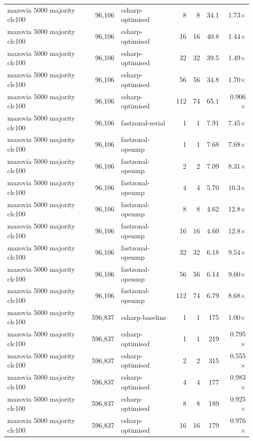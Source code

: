 \begin{tabular}{lrlrrrr}
mazovia 5000 majority clc100 & 96,106 & csharp-optimised & 8 & 8 & 34.1 & 1.73$\times$ \\
mazovia 5000 majority clc100 & 96,106 & csharp-optimised & 16 & 16 & 40.8 & 1.44$\times$ \\
mazovia 5000 majority clc100 & 96,106 & csharp-optimised & 32 & 32 & 39.5 & 1.49$\times$ \\
mazovia 5000 majority clc100 & 96,106 & csharp-optimised & 56 & 56 & 34.8 & 1.70$\times$ \\
mazovia 5000 majority clc100 & 96,106 & csharp-optimised & 112 & 74 & 65.1 & 0.906$\times$ \\
mazovia 5000 majority clc100 & 96,106 & fastzonal-serial & 1 & 1 & 7.91 & 7.45$\times$ \\
mazovia 5000 majority clc100 & 96,106 & fastzonal-openmp & 1 & 1 & 7.68 & 7.68$\times$ \\
mazovia 5000 majority clc100 & 96,106 & fastzonal-openmp & 2 & 2 & 7.09 & 8.31$\times$ \\
mazovia 5000 majority clc100 & 96,106 & fastzonal-openmp & 4 & 4 & 5.70 & 10.3$\times$ \\
mazovia 5000 majority clc100 & 96,106 & fastzonal-openmp & 8 & 8 & 4.62 & 12.8$\times$ \\
mazovia 5000 majority clc100 & 96,106 & fastzonal-openmp & 16 & 16 & 4.60 & 12.8$\times$ \\
mazovia 5000 majority clc100 & 96,106 & fastzonal-openmp & 32 & 32 & 6.18 & 9.54$\times$ \\
mazovia 5000 majority clc100 & 96,106 & fastzonal-openmp & 56 & 56 & 6.14 & 9.60$\times$ \\
mazovia 5000 majority clc100 & 96,106 & fastzonal-openmp & 112 & 74 & 6.79 & 8.68$\times$ \\
mazovia 5000 majority clc100 & 596,837 & csharp-baseline & 1 & 1 & 175 & 1.00$\times$ \\
mazovia 5000 majority clc100 & 596,837 & csharp-optimised & 1 & 1 & 219 & 0.795$\times$ \\
mazovia 5000 majority clc100 & 596,837 & csharp-optimised & 2 & 2 & 315 & 0.555$\times$ \\
mazovia 5000 majority clc100 & 596,837 & csharp-optimised & 4 & 4 & 177 & 0.983$\times$ \\
mazovia 5000 majority clc100 & 596,837 & csharp-optimised & 8 & 8 & 189 & 0.925$\times$ \\
mazovia 5000 majority clc100 & 596,837 & csharp-optimised & 16 & 16 & 179 & 0.976$\times$ \\

\end{tabular}
